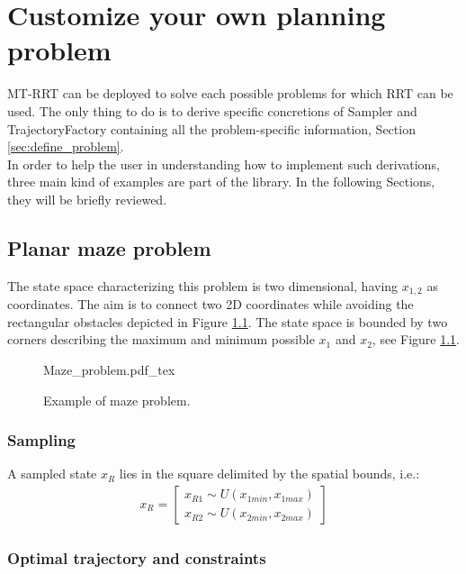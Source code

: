 \chapter{Customize your own planning problem}
\label{chap:custom}

MT-RRT can be deployed to solve each possible problems for which RRT can be used. The only thing to do is to derive specific concretions of Sampler and TrajectoryFactory containing all the problem-specific information, Section \ref{sec:define_problem}.
\\
In order to help the user in understanding how to implement such derivations, three main kind of examples are part of the library. In the following Sections, they will be briefly reviewed.

\section{Planar maze problem}

The state space characterizing this problem is two dimensional, having $x_{1,2}$ as coordinates. The aim is to connect two 2D coordinates while avoiding the rectangular obstacles depicted in Figure \ref{fig:Maze_problem}.
The state space is bounded by two corners describing the maximum and minimum possible $x_1$ and $x_2$, see Figure \ref{fig:Maze_problem}.

 \begin{figure}
	 \centering
 \def\svgwidth{0.85 \columnwidth}
 {Maze_problem.pdf_tex} 
	 \caption{Example of maze problem.}
 \label{fig:Maze_problem}
 \end{figure}

\subsection{Sampling}

A sampled state $x_R$ lies in the square delimited by the spatial bounds, i.e.:
\begin{eqnarray}
x_R = \begin{bmatrix} x_{R1} \sim U(x_{1min}, x_{1max}) \\ x_{R2} \sim U(x_{2min}, x_{2max})  \end{bmatrix}
\end{eqnarray}

\subsection{Optimal trajectory and constraints}
\label{sec:traj_maze}

